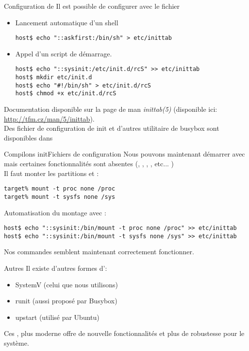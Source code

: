 \begin{frame}[fragile=singleslide]{Configuration de }
  Il est possible de configurer  avec le fichier
  \begin{itemize}
  \item Lancement automatique d'un shell
    \begin{lstlisting}
host$ echo "::askfirst:/bin/sh" > etc/inittab 
    \end{lstlisting}
  \item Appel d'un script de démarrage.
    \begin{lstlisting}
host$ echo "::sysinit:/etc/init.d/rcS" >> etc/inittab
host$ mkdir etc/init.d
host$ echo "#!/bin/sh" > etc/init.d/rcS
host$ chmod +x etc/init.d/rcS
    \end{lstlisting}
  \end{itemize}
  Documentation disponible sur la page de man \emph{inittab(5)}
  (disponible ici: \url{http://tfm.cz/man/5/inittab}).\\[2ex]
  Des  fichier de  configuration  de init  et  d'autres utilitaire  de
  busybox sont disponibles dans 
\end{frame}

\begin{frame}[fragile=singleslide]{Compilons init}{Fichiers de configuration}
  Nous  pouvons  maintenant  démarrer avec    mais
  certaines fonctionnalités sont absentes (, , 
  , , etc... )\\
  Il faut monter les partitions  et :
  \begin{lstlisting}
target% mount -t proc none /proc
target% mount -t sysfs none /sys
  \end{lstlisting}
  Automatisation du montage avec :
  \begin{lstlisting}
host$ echo "::sysinit:/bin/mount -t proc none /proc" >> etc/inittab 
host$ echo "::sysinit:/bin/mount -t sysfs none /sys" >> etc/inittab 
  \end{lstlisting}
  Nos commandes semblent maintenant correctement fonctionner.
\end{frame}

\begin{frame}[fragile=singleslide]{Autres }
  Il existe d'autres formes d':
  \begin{itemize}
  \item SystemV (celui que nous utilisons)
  \item runit (aussi proposé par Busybox)
  \item upstart (utilisé par Ubuntu)
  \end{itemize}
  Ces ,  plus moderne  offre de nouvelle  fonctionnalités et
  plus de robustesse pour le système.
\end{frame}


